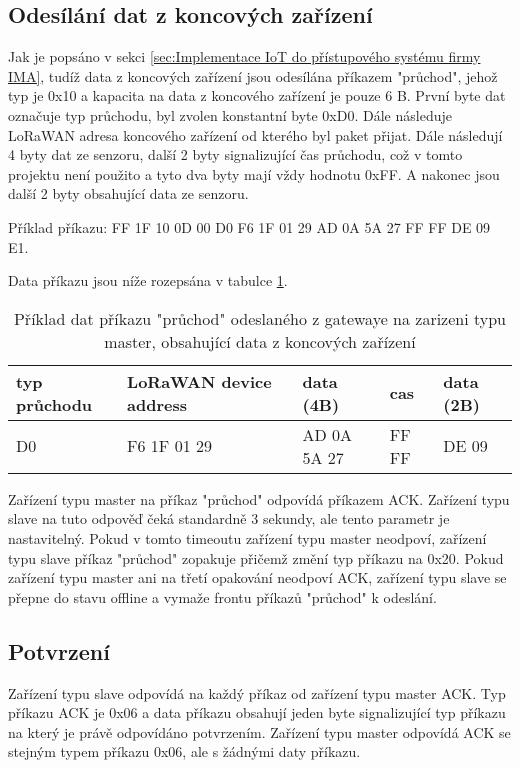 \subsection{Odesílání dat z koncových zařízení}
\label{sec:Odesílání dat z koncových zařízení}
Jak je popsáno v sekci \ref{sec:Implementace IoT do přístupového systému firmy IMA}, tudíž data z koncových zařízení jsou odesílána příkazem "průchod", jehož typ je 0x10 a kapacita na data z koncového zařízení je pouze 6 B. 
První byte dat označuje typ průchodu, byl zvolen konstantní byte 0xD0. Dále následuje LoRaWAN adresa koncového zařízení od kterého byl paket přijat. Dále následují 4 byty dat ze senzoru, další 2 byty signalizující čas průchodu, což v tomto projektu není použito a tyto dva byty mají vždy hodnotu 0xFF. A nakonec jsou další 2 byty obsahující data ze senzoru.

Příklad příkazu: FF 1F 10 0D 00 D0 F6 1F 01 29 AD 0A 5A 27 FF FF DE 09 E1.

Data příkazu jsou níže rozepsána v tabulce \ref{table:prikladprikazpruchod}.

\begin{table}[!h]
    \centering
\begin{tabular}{ | p{1.5cm} | p{3cm} | p{2.5cm} | p{1.3cm} | p{1.3cm} |  }
 \hline
 typ průchodu & LoRaWAN device address & data (4B)     & cas   & data (2B) \\ \hline
 D0           & F6 1F 01 29            &  AD 0A 5A 27  & FF FF & DE 09     \\ 
 \hline
\end{tabular}
    \caption{Příklad dat příkazu "průchod" odeslaného z gatewaye na zarizeni typu master, obsahující data z koncových zařízení}
    \label{table:prikladprikazpruchod}
\end{table}

Zařízení typu master na příkaz "průchod" odpovídá příkazem ACK. Zařízení typu slave na tuto odpověď čeká standardně 3 sekundy, ale tento parametr je nastavitelný. Pokud v tomto timeoutu zařízení typu master neodpoví, zařízení typu slave příkaz "průchod" zopakuje přičemž změní typ příkazu na 0x20. Pokud zařízení typu master ani na třetí opakování neodpoví ACK, zařízení typu slave se přepne do stavu offline a vymaže frontu příkazů "průchod" k odeslání.

\subsection{Potvrzení}
Zařízení typu slave odpovídá na každý příkaz od zařízení typu master ACK. Typ příkazu ACK je 0x06 a data příkazu obsahují jeden byte signalizující typ příkazu na který je právě odpovídáno potvrzením.
Zařízení typu master odpovídá ACK se stejným typem příkazu 0x06, ale s žádnými daty příkazu.

